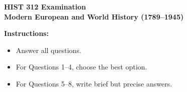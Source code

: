 \documentclass[11pt]{article}
\begin{document}
\begin{center}
  {\Large \textbf{HIST 312 Examination}}\\[0.25em]
  {\large \textbf{Modern European and World History (1789--1945)}}\\[0.5em]
\end{center}

\noindent\textbf{Instructions:}
\begin{itemize}
  \item Answer all questions.
  \item For Questions 1--4, choose the best option.
  \item For Questions 5--8, write brief but precise answers.
\end{itemize}

\vspace{0.5em}
\end{document}
